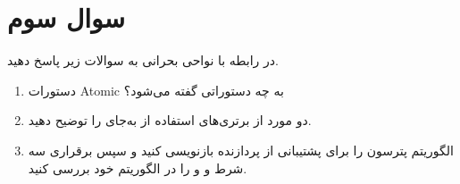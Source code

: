 \section{سوال سوم}

در رابطه با نواحی بحرانی به سوالات زیر پاسخ دهید.

\begin{enumerate}
	\item 
	دستورات Atomic به چه دستوراتی گفته می‌شود؟
	
	\begin{qsolve}
		
	\end{qsolve}
	
	
	\item 
	دو مورد از برتری‌های استفاده از  به‌جای  را توضیح دهید.
	
	\begin{qsolve}
		
	\end{qsolve}
	
	
	
	\item 
	الگوریتم پترسون را برای پشتیبانی از  پردازنده بازنویسی کنید و سپس برقراری سه شرط   و و  را در الگوریتم خود بررسی کنید.
	
	\begin{qsolve}
		
	\end{qsolve}
	
	
\end{enumerate}


